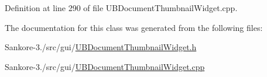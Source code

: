 Definition at line 290 of file U\-B\-Document\-Thumbnail\-Widget.\-cpp.



The documentation for this class was generated from the following files\-:\begin{DoxyCompactItemize}
\item 
Sankore-\/3./src/gui/\hyperlink{_u_b_document_thumbnail_widget_8h}{U\-B\-Document\-Thumbnail\-Widget.\-h}\item 
Sankore-\/3./src/gui/\hyperlink{_u_b_document_thumbnail_widget_8cpp}{U\-B\-Document\-Thumbnail\-Widget.\-cpp}\end{DoxyCompactItemize}
